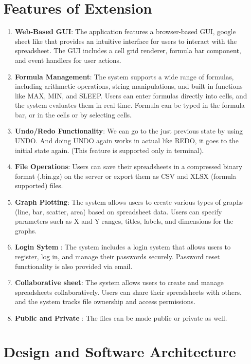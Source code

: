 \documentclass[10pt,a4paper]{article}  %
\begin{document}
\section{Features of Extension}
\begin {enumerate}
\item \textbf{Web-Based GUI}: The application features a browser-based GUI, google sheet like that provides an intuitive interface for users to interact with the spreadsheet. The GUI includes a cell grid renderer, formula bar component, and event handlers for user actions.
    \item \textbf{Formula Management}: The system supports a wide range of formulas, including arithmetic operations, string manipulations, and built-in functions like MAX, MIN, and SLEEP. Users can enter formulas directly into cells, and the system evaluates them in real-time. Formula can be typed in the formula bar, or in the cells or by selecting cells.
    \item \textbf{Undo/Redo Functionality}: We can go to the just previous state by using UNDO. And doing UNDO again works in actual like REDO, it goes to the initial state again. (This feature is supported only in terminal).
    \item \textbf{File Operations}: Users can save their spreadsheets in a compressed binary format (.bin.gz) on the server or export them as CSV and XLSX (formula supported) files. 
    \item \textbf{Graph Plotting}: The system allows users to create various types of graphs (line, bar, scatter, area) based on spreadsheet data. Users can specify parameters such as X and Y ranges, titles, labels, and dimensions for the graphs.
    \item \textbf{Login Sytem} : The system includes a login system that allows users to register, log in, and manage their passwords securely. Password reset functionality is also provided via email.
    \item \textbf{Collaborative sheet}: The system allows users to create and manage spreadsheets collaboratively. Users can share their spreadsheets with others, and the system tracks file ownership and access permissions.
    \item \textbf{Public and Private} : The files can be made public or private as well.

\end{enumerate}

\section{Design and Software Architecture}
\end{document}
